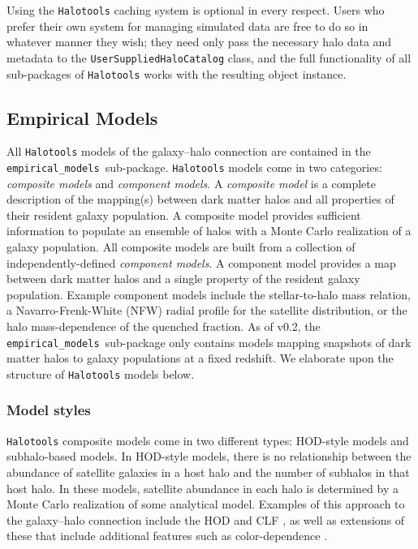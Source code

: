 \documentclass[twocolumn, tighten]{aastex6}
\newcommand{\emodels}{{\tt empirical\_models }}
\begin{document}
Using the {\tt Halotools} caching system is optional in every respect. Users who prefer their own system for managing simulated data are free to do so in whatever manner they wish; they need only pass the necessary halo data and metadata to the {\tt UserSuppliedHaloCatalog} class, and the full functionality of all sub-packages of {\tt Halotools} works with the resulting object instance.

\subsection{Empirical Models}
\label{subsection:empirical_models}

All {\tt Halotools} models of the galaxy--halo connection are contained in the \emodels sub-package. {\tt Halotools} models come in two categories: {\em composite models} and {\em component models}.
A {\em composite model} is a complete description of the mapping(s) between dark matter halos and all properties of their resident galaxy population. A composite model provides sufficient information to populate an ensemble of halos with a Monte Carlo realization of a galaxy population. All composite models are built from a collection of independently-defined {\em component models}. A component model provides a map between dark matter halos and a single property of the resident galaxy population. Example component models include the stellar-to-halo mass relation, a Navarro-Frenk-White (NFW) radial profile for the satellite distribution, or the halo mass-dependence of the quenched fraction. As of v0.2, the \emodels sub-package only contains models mapping snapshots of dark matter halos to galaxy populations at a fixed redshift. We elaborate upon the structure of {\tt Halotools} models below.

\subsubsection{Model styles}
\label{subsubsection:modelstyles}

{\tt Halotools} composite models come in two different types: HOD-style models and subhalo-based models. In HOD-style models, there is no relationship between the abundance of satellite galaxies in a host halo and the number of subhalos in that host halo. In these models, satellite abundance in each halo is determined by a Monte Carlo realization of some analytical model. Examples of this approach to the galaxy--halo connection include the HOD \citep{berlind02} and CLF \citep{yang03}, as well as extensions of these that include additional features such as color-dependence \citep{tinker_etal13}.
\end{document}
